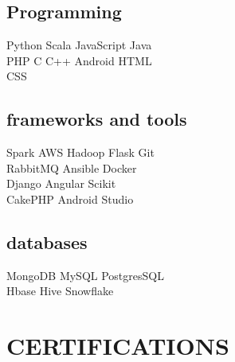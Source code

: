 \documentclass[]{deedy-resume-openfont}
\begin{document}
\begin{minipage}[t]{0.33\textwidth}
\subsection{Programming}
Python \textbullet{} Scala \textbullet{} JavaScript \textbullet{} Java  \\ \textbullet{}  PHP \textbullet{} C \textbullet{} C++ \textbullet{} Android \textbullet{} HTML \\ \textbullet{} CSS 
\sectionsep

\subsection{frameworks and tools} 

Spark \textbullet{} AWS \textbullet{} Hadoop \textbullet{}
Flask \textbullet{} Git \\ \textbullet{} RabbitMQ \textbullet{} Ansible \textbullet{} Docker  \\ \textbullet{} Django \textbullet{}  Angular \textbullet{} Scikit \\ \textbullet{} CakePHP
\textbullet{} Android Studio
\sectionsep

\subsection{databases}
MongoDB \textbullet{} MySQL \textbullet{} PostgresSQL \\ \textbullet{} Hbase \textbullet{} Hive \textbullet{} Snowflake 
\sectionsep


\section{CERTIFICATIONS} 

\vspace{1mm}
\vspace{1mm}
\vspace{1mm}

%
%

\end{minipage} 
\end{document}
